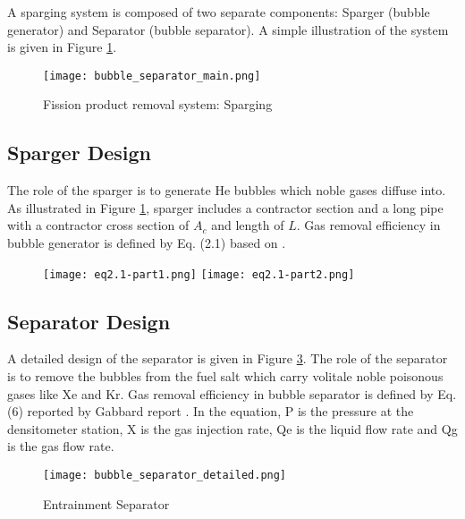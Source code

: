     A sparging system is composed of two separate components: Sparger (bubble generator) and Separator (bubble separator). A simple illustration of the system is given in Figure \ref{fig:sparging}.

    \begin{figure}[htbp!]
        \begin{center}
            \texttt{[image: bubble\_separator\_main.png]}
        \end{center}
        \caption{Fission product removal system: Sparging}
        \label{fig:sparging}
    \end{figure}

\subsection{Sparger Design}

    The role of the sparger is to generate He bubbles which noble gases diffuse into. As illustrated in Figure \ref{fig:sparging}, sparger includes a contractor section and a long pipe with a contractor cross section of $A_c$ and length of $L$. Gas removal efficiency in bubble generator is defined by Eq. (2.1) based on \cite{peebles_removal_1968}.

    \begin{figure}[h!]
        \begin{center}
            \texttt{[image: eq2.1-part1.png]}
            \texttt{[image: eq2.1-part2.png]}
        \end{center}
        \label{fig:eq2}
    \end{figure}

\newpage
\FloatBarrier

\subsection{Separator Design}

    A detailed design of the separator is given in Figure \ref{fig:bubble_sprt}. The role of the separator is to remove the bubbles from the fuel salt which carry volitale noble poisonous gases like Xe and Kr. Gas removal efficiency in bubble separator is defined by Eq. (6) reported by Gabbard report \cite{gabbard_development_1974}. In the equation, P is the pressure at the densitometer station, X is the gas injection rate, Qe is the liquid flow rate and Qg is the gas flow rate.

    \begin{figure}[htbp!]
        \begin{center}
            \texttt{[image: bubble\_separator\_detailed.png]}
        \end{center}
        \caption{Entrainment Separator}
        \label{fig:bubble_sprt}
    \end{figure}


